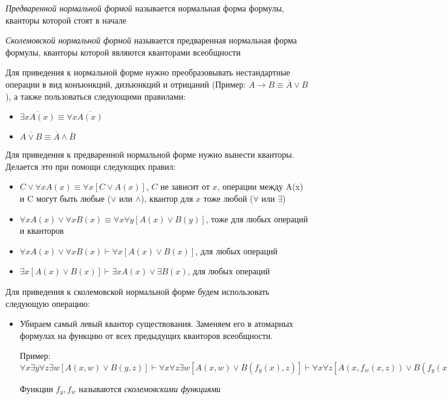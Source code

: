 \documentclass{article}
\begin{document}
\begin{definition}
	\textit{Предваренной нормальной формой} называется нормальная форма формулы, кванторы которой стоят в начале
\end{definition}

\begin{definition}
	\textit{Сколемовской нормальной формой} называется предваренная нормальная форма формулы, кванторы которой являются кванторами всеобщности
\end{definition}

Для приведения к нормальной форме нужно преобразовывать нестандартные операции в вид конъюнкций, дизъюнкций и отрицаний (Пример: $A \rightarrow B \equiv \overline{A} \vee B$), а также пользоваться следующими правилами:
\begin{itemize}
	\item $\overline{\exists x A(x)} \equiv \forall x\overline{A(x)}$
	\item $\overline{A \vee B} \equiv \overline{A} \wedge \overline{B}$
\end{itemize}

Для приведения к предваренной нормальной форме нужно вынести кванторы. Делается это при помощи следующих правил:
\begin{itemize}
	\item $C \vee \forall x A(x) \equiv \forall x[C \vee A(x)]$, $C$ не зависит от $x$, операции между A(x) и C могут быть любые ($\vee$ или $\wedge$), квантор для $x$ тоже любой ($\forall$ или $\exists$)
	\item $\forall x A(x) \vee \forall x B(x) \equiv \forall x\forall y[A(x) \vee B(y)]$, тоже для любых операций и кванторов
	\item $\forall x A(x) \vee \forall x B(x) \vdash \forall x[A(x) \vee B(x)]$, для любых операций
	\item $\exists x[A(x) \vee B(x)] \vdash \exists x A(x) \vee \exists B(x)$, для любых операций
\end{itemize}

Для приведения к сколемовской нормальной форме будем использовать следующую операцию:
\begin{itemize}
	\item Убираем самый левый квантор существования. Заменяем его в атомарных формулах на функцию от всех предыдущих кванторов всеобщности.

	Пример: $\forall x \exists y \forall z \exists w[A(x, w) \vee B(y, z)] \vdash \forall x \forall z \exists w[A(x, w) \vee B(f_y(x), z)] \vdash \forall x \forall z[A(x, f_w(x, z)) \vee B(f_y(x), z)]$

	Функции $f_y, f_w$ называются \textit{сколемовскими функциями}
\end{itemize}
\end{document}
